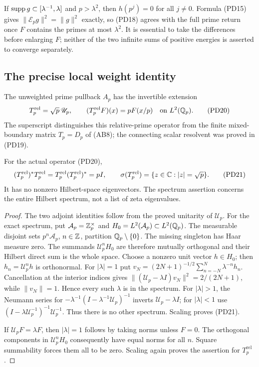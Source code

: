 If $\operatorname{supp} g\subset[\lambda^{-1},\lambda]$ and $p>\lambda^2$,
then $h(p^j)=0$ for all $j\ne0$. Formula (PD15) gives
$\|\mathcal E_pg\|^2=\|g\|^2$ exactly, so (PD18) agrees with the
full prime return once $F$ contains the primes at most $\lambda^2$.
It is essential to take the differences before enlarging $F$; neither
of the two infinite sums of positive energies is asserted to converge
separately.

\subsection{The precise local weight identity}
The unweighted prime pullback $A_p$ has the invertible extension
\[
 T_p^{\mathrm{rel}}=\sqrt p\,\mathscr U_p,
 \qquad (T_p^{\mathrm{rel}}F)(x)=pF(x/p)
 \quad\hbox{on }L^2(\mathbb Q_p).
 \tag{PD20}
\]
The superscript distinguishes this relative-prime operator from the
finite mixed-boundary matrix $T_p=D_p$ of (AB8); the connecting scalar
resolvent was proved in (PD19).

\begin{theorem}
\label{thm:PD-local-weight}
For the actual operator (PD20),
\[
 (T_p^{\mathrm{rel}})^*T_p^{\mathrm{rel}}
 =T_p^{\mathrm{rel}}(T_p^{\mathrm{rel}})^*=pI,
 \qquad \sigma(T_p^{\mathrm{rel}})=\{z\in\mathbb C:|z|=\sqrt p\}.
 \tag{PD21}
\]
It has no nonzero Hilbert-space eigenvectors. The spectrum assertion
concerns the entire Hilbert spectrum, not a list of zeta eigenvalues.
\end{theorem}
\begin{proof}
The two adjoint identities follow from the proved unitarity of $\mathscr U_p$.
For the exact spectrum, put
$\mathcal A_p=\mathbb Z_p^\times$ and
$H_0=L^2(\mathcal A_p)\subset L^2(\mathbb Q_p)$. The measurable disjoint
sets $p^n\mathcal A_p$, $n\in\mathbb Z$, partition $\mathbb Q_p\setminus\{0\}$.
The missing singleton has Haar measure zero. The summands
$\mathscr U_p^nH_0$ are therefore mutually orthogonal and their Hilbert direct
sum is the whole space. Choose a nonzero unit vector $h\in H_0$;
then $h_n=\mathscr U_p^nh$ is orthonormal. For $|\lambda|=1$ put
$v_N=(2N+1)^{-1/2}\sum_{n=-N}^N\lambda^{-n}h_n$.
Cancellation at the interior indices gives
$\|(\mathscr U_p-\lambda I)v_N\|^2=2/(2N+1)$, while $\|v_N\|=1$.
Hence every such $\lambda$ is in the spectrum. For $|\lambda|>1$,
the Neumann series for $-\lambda^{-1}(I-\lambda^{-1}\mathscr U_p)^{-1}$
inverts $\mathscr U_p-\lambda I$; for $|\lambda|<1$ use
$(I-\lambda \mathscr U_p^{-1})^{-1}\mathscr U_p^{-1}$. Thus there is no other spectrum.
Scaling proves (PD21).

If $\mathscr U_pF=\lambda F$, then $|\lambda|=1$ follows by taking norms
unless $F=0$. The orthogonal components in $\mathscr U_p^nH_0$ consequently
have equal norms for all $n$. Square summability forces them all to
be zero. Scaling again proves the assertion for $T_p^{\mathrm{rel}}$.
\end{proof}

